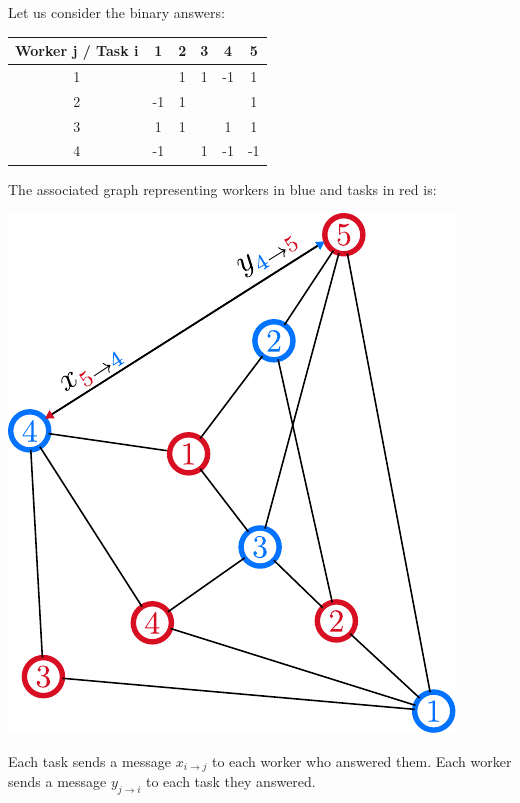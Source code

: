 \begin{constructionbox}
Let us consider the binary answers:
\begin{center}
\begin{tabular}{|c|ccccc|}
    \hline
    \textbf{Worker j / Task i} & \textbf{1} & \textbf{2} & \textbf{3} & \textbf{4} & \textbf{5} \\
    \hline
    1 &    & 1  & 1  & -1  &  1 \\
    2 & -1 & 1  &    &     &  1 \\
    3 & 1  & 1  &    & 1   &  1 \\
    4 & -1 &    & 1  & -1  & -1 \\
    \hline
\end{tabular}
\end{center}

The associated graph representing workers in blue and tasks in red is:

\begin{minipage}[c]{0.40\textwidth}
    \begin{center}
    \includegraphics[width=\textwidth]{./images_benchopt/network_kos.pdf}
    \end{center}
    \end{minipage}\hfill
    \begin{minipage}[c]{0.45\textwidth}
    Each task sends a message $x_{i\rightarrow j}$ to each worker who answered them. Each worker sends a message $y_{j\rightarrow i}$ to each task they answered.


\end{minipage}
\end{constructionbox}
